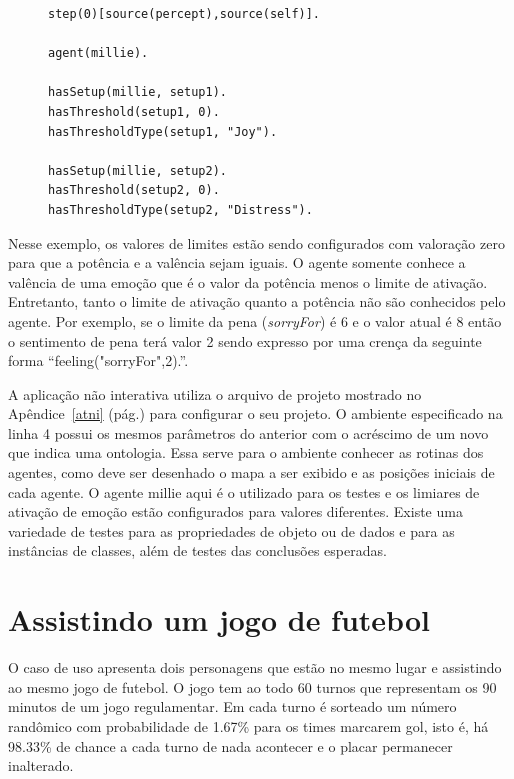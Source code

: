 \lstset{linewidth=80mm}
\begin{figure}
	\begin{lstlisting}[frame=trbl,
caption=Parte do código do agente para aplicação interativa de teste.,
label=lst:testeJasonIntSetup]
step(0)[source(percept),source(self)].

agent(millie).

hasSetup(millie, setup1).
hasThreshold(setup1, 0).
hasThresholdType(setup1, "Joy").

hasSetup(millie, setup2).
hasThreshold(setup2, 0).
hasThresholdType(setup2, "Distress").
	\end{lstlisting}
\end{figure}

Nesse exemplo, os valores de limites estão sendo configurados com valoração
zero para que a potência e a valência sejam iguais. O agente somente conhece
a valência de uma emoção que é o valor da potência menos o limite de
ativação. Entretanto, tanto o limite de ativação quanto a potência não são
conhecidos pelo agente. Por exemplo, se o limite da pena (\emph{sorryFor}) é 6
e o valor atual é 8 então o sentimento de pena terá valor 2 sendo
expresso por uma crença da seguinte forma ``feeling("sorryFor",2).''.


A aplicação não interativa utiliza o arquivo de projeto mostrado no
Apêndice~\ref{atni} (pág.\pageref{atni}) para
configurar o seu projeto. O ambiente especificado na linha 4 possui os mesmos
parâmetros do anterior com o acréscimo de um novo que indica uma ontologia.
Essa serve para o ambiente conhecer as rotinas dos agentes, como
deve ser desenhado o mapa a ser exibido e as posições iniciais de cada
agente. O agente millie aqui é o utilizado para os testes e os limiares de
ativação de emoção estão configurados para valores diferentes. Existe uma
variedade de testes para as propriedades de objeto ou de dados e para as
instâncias de classes, além de testes das conclusões esperadas.

\section{Assistindo um jogo de futebol} \label{ch:cdu:svc}

O caso de uso apresenta dois personagens que estão no mesmo lugar e assistindo ao mesmo jogo de
futebol. O jogo tem ao todo 60 turnos que representam os 90 minutos de um jogo
regulamentar. Em cada turno é sorteado um número randômico com probabilidade
de 1.67\% para os times marcarem gol, isto é, há 98.33\% de
chance a cada turno de nada acontecer e o placar permanecer inalterado.

